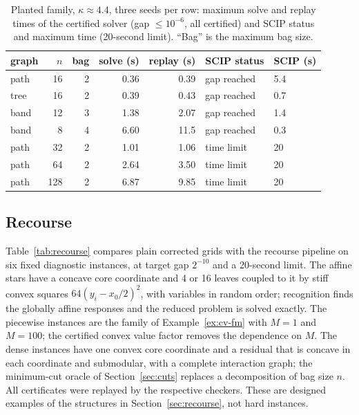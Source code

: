 \begin{table}[t]
\centering
\caption{Planted family, $\kappa\approx4.4$, three seeds per row: maximum solve and
replay times of the certified solver (gap $\le10^{-6}$, all certified) and SCIP
status and maximum time (20-second limit). ``Bag'' is the maximum bag
size.}\label{tab:scip}
\begin{tabular}{lrrrrll}
\toprule
graph & $n$ & bag & solve (s) & replay (s) & SCIP status & SCIP (s)\\
\midrule
path & 16 & 2 & 0.36 & 0.39 & gap reached & 5.4\\
tree & 16 & 2 & 0.39 & 0.43 & gap reached & 0.7\\
band & 12 & 3 & 1.38 & 2.07 & gap reached & 1.4\\
band & 8 & 4 & 6.60 & 11.5 & gap reached & 0.3\\
path & 32 & 2 & 1.01 & 1.06 & time limit & 20\\
path & 64 & 2 & 2.64 & 3.50 & time limit & 20\\
path & 128 & 2 & 6.87 & 9.85 & time limit & 20\\
\bottomrule
\end{tabular}
\end{table}

\subsection{Recourse}
Table~\ref{tab:recourse} compares plain corrected grids with the recourse
pipeline on six fixed diagnostic instances, at target gap $2^{-10}$ and a
20-second limit. The affine stars have a concave core coordinate and 4 or 16
leaves coupled to it by stiff convex squares $64(y_i-x_0/2)^2$, with variables
in random order; recognition finds the globally affine responses and the
reduced problem is solved exactly. The piecewise instances are the family of
Example~\ref{ex:cv-fm} with $M=1$ and $M=100$; the certified convex value
factor removes the dependence on $M$. The dense instances have one convex
core coordinate and a residual that is concave in each coordinate and
submodular, with a complete interaction graph; the minimum-cut oracle of
Section~\ref{sec:cuts} replaces a decomposition of bag size $n$. All
certificates were replayed by the respective checkers. These are designed
examples of the structures in Section~\ref{sec:recourse}, not hard instances.

